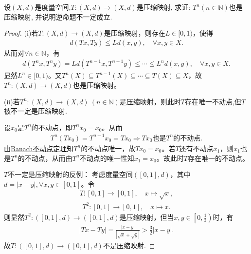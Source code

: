 \documentclass[../../main.tex]{subfiles}%
\begin{document}
\begin{example}
设$(X,d)$是度量空间,$T:(X,d)\to (X,d)$是压缩映射, 求证: $T^n(n\in\mathbb{N})$也是压缩映射, 并说明逆命题不一定成立.
\end{example}
\begin{proof}

(i)若$T:(X,d)\to(X,d)$是压缩映射，则存在$L\in[0,1)$，使得
\begin{align*}
d(Tx,Ty)\leqslant Ld(x,y),\quad \forall x,y\in X.
\end{align*}
从而对$\forall n\in\mathbb{N}$，有
\begin{align*}
d(T^nx,T^ny)=Ld(T^{n-1}x,T^{n-1}y)\leqslant\cdots\leqslant L^nd(x,y),\quad \forall x,y\in X.
\end{align*}
显然$L^n\in[0,1)$。又$T^n(X)\subseteq T^{n-1}(X)\subseteq\cdots\subseteq T(X)\subseteq X$，故$T^n:(X,d)\to(X,d)$也是压缩映射。

(ii)若$T^n:(X,d)\to(X,d)\ (n\in\mathbb{N})$是压缩映射，则此时$T$存在唯一不动点,但$T$被不一定是压缩映射.

设$x_0$是$T^n$的不动点，即$T^nx_0=x_0$。从而
\begin{align*}
T^n(Tx_0)=T^{n+1}x_0=Tx_0\Longrightarrow Tx_0\text{也是}T^n\text{的不动点}.
\end{align*}
由\hyperref[theorem:Banach不动点定理——压缩映象原理]{Banach不动点定理}知$T^n$的不动点唯一，故$Tx_0=x_0$。若$T$还有不动点$x_1$，则$x_1$也是$T^n$的不动点，从而由$T^n$不动点的唯一性知$x_1=x_0$。故此时$T$存在唯一的不动点。

$T$不一定是压缩映射的反例：
考虑度量空间$([0,1],d)$，其中$d=|x-y|,\forall x,y\in[0,1]$。令
\begin{align*}
T:[0,1]\to[0,1],\quad x\mapsto \sqrt{x},
\end{align*}
\begin{align*}
T^2:[0,1]\to[0,1],\quad x\mapsto x.
\end{align*}
则显然$T^2:([0,1],d)\to([0,1],d)$是压缩映射，但当$x,y\in\left[0,\frac{1}{3}\right)$时，有
\begin{align*}
|Tx-Ty|=\frac{|x-y|}{|\sqrt{x}+\sqrt{y}|}>\frac{3}{2}|x-y|.
\end{align*}
故$T:([0,1],d)\to([0,1],d)$不是压缩映射.

\end{proof}
\end{document}
